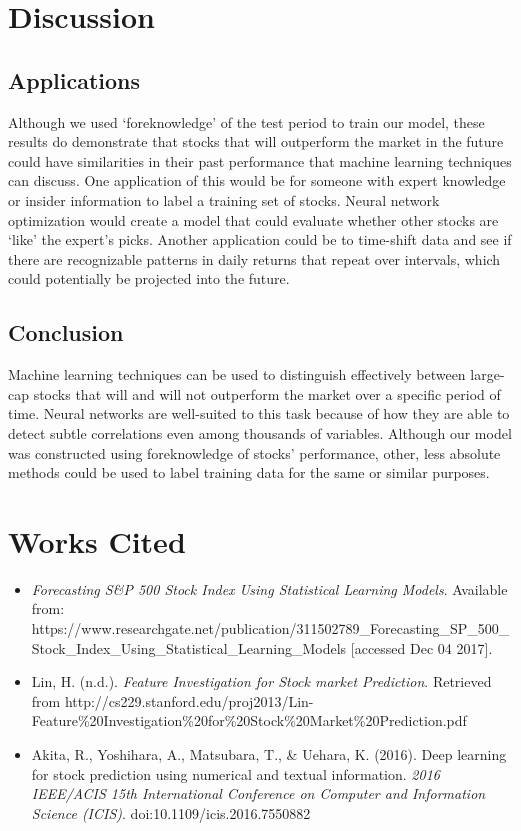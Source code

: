 \documentclass[format=acmlarge]{acmart}
\begin{document}
\section{Discussion}
\subsection{Applications}
Although we used `foreknowledge' of the test period to train our model, these results do demonstrate that stocks that will outperform the market in the future could have similarities in their past performance that machine learning techniques can discuss.  One application of this would be for someone with expert knowledge or insider information to label a training set of stocks.  Neural network optimization would create a model that could evaluate whether other stocks are `like' the expert's picks.  Another application could be to time-shift data and see if there are recognizable patterns in daily returns that repeat over intervals, which could potentially be projected into the future.

\subsection{Conclusion}
Machine learning techniques can be used to distinguish effectively between large-cap stocks that will and will not outperform the market over a specific period of time.  Neural networks are well-suited to this task because of how they are able to detect subtle correlations even among thousands of variables.  Although our model was constructed using foreknowledge of stocks' performance, other, less absolute methods could be used to label training data for the same or similar purposes.

\section{Works Cited}
\begin{itemize}
  \item \textit{Forecasting S\&P 500 Stock Index Using Statistical Learning Models}. Available from: https://www.researchgate.net/publication/311502789\_Forecasting\_SP\_500\_Stock\_Index\_Using\_Statistical\_Learning\_Models [accessed Dec 04 2017].
  \item Lin, H. (n.d.). \textit{Feature Investigation for Stock market Prediction}. Retrieved from http://cs229.stanford.edu/proj2013/Lin-Feature\%20Investigation\%20for\%20Stock\%20Market\%20Prediction.pdf
  \item Akita, R., Yoshihara, A., Matsubara, T., \& Uehara, K. (2016). Deep learning for stock prediction using numerical and textual information. \textit{2016 IEEE/ACIS 15th International Conference on Computer and Information Science (ICIS)}. doi:10.1109/icis.2016.7550882
\end{itemize}
\end{document}
